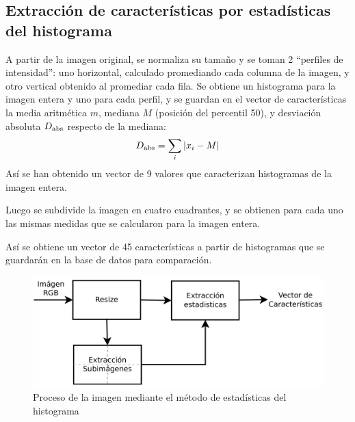 \documentclass[conference,spanish,a4paper,10pt,oneside,final]{tfmpd}
\begin{document}
\subsection*{Extracción de características por estadísticas del histograma}
A partir de la imagen original, se normaliza su tamaño y se toman 2 ``perfiles de
intensidad'': uno horizontal, calculado promediando cada columna de la imagen, y
otro vertical obtenido al promediar cada fila. Se obtiene un histograma para la
imagen entera y uno para cada perfil, y se guardan en el vector de
características la media aritmética $m$, mediana $M$ (posición del percentil 50),
 y desviación absoluta $D_{\textrm{abs}}$ respecto de la mediana:
\begin{equation*}
D_{\textrm{abs}}=\sum_i |x_i - M|
\end{equation*}
Así se han obtenido un vector de 9 valores que caracterizan histogramas de la
imagen entera.

Luego se subdivide la imagen en cuatro cuadrantes, y se obtienen para cada uno
las mismas medidas que se calcularon para la imagen entera.

Así se obtiene un vector de 45 características a partir de histogramas que se
guardarán en la base de datos para comparación.

\begin{figure}
\begin{center}
\includegraphics[scale=0.25]{../diagramas/procesoestadisticas} 
\end{center}
\caption{Proceso de la imagen mediante el método de estadísticas del histograma}
\label{procesoestadisticas}
\end{figure}

%
%
\end{document}

